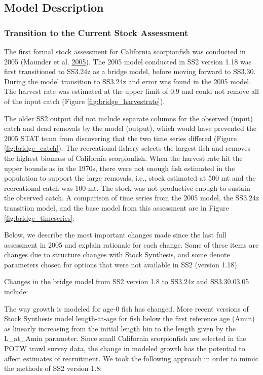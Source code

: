 \documentclass[12pt,]{article}
\begin{document}
\subsection{Model Description}\label{model-description}

\subsubsection{Transition to the Current Stock
Assessment}\label{transition-to-the-current-stock-assessment}

The first formal stock assessment for California scorpionfish was
conducted in 2005 (Maunder et al.
\protect\hyperlink{ref-Maunder2005}{2005}). The 2005 model conducted in
SS2 version 1.18 was first transitioned to SS3.24z as a bridge model,
before moving forward to SS3.30. During the model transition to SS3.24z
and error was found in the 2005 model. The harvest rate was estimated at
the upper limit of 0.9 and could not remove all of the input catch
(Figure \ref{fig:bridge_harvestrate}).

The older SS2 output did not include separate columns for the observed
(input) catch and dead removals by the model (output), which would have
prevented the 2005 STAT team from discovering that the two time series
differed (Figure \ref{fig:bridge_catch}). The recreational fishery
selects the largest fish and removes the highest biomass of California
scorpionfish. When the harvest rate hit the upper bounds as in the
1970s, there were not enough fish estimated in the population to support
the large removals, i.e., stock estimated at 500 mt and the recreational
catch was 100 mt. The stock was not productive enough to sustain the
observed catch. A comparison of time series from the 2005 model, the
SS3.24z transition model, and the base model from this assessment are in
Figure \ref{fig:bridge_timeseries}.

Below, we describe the most important changes made since the last full
assessment in 2005 and explain rationale for each change. Some of these
items are changes due to structure changes with Stock Synthesis, and
some denote parameters chosen for options that were not available in SS2
(version 1.18).

Changes in the bridge model from SS2 version 1.8 to SS3.24z and
SS3.30.03.05 include:

The way growth is modeled for age-0 fish has changed. More recent
versions of Stock Synthesis model length-at-age for fish below the first
reference age (Amin) as linearly increasing from the initial length bin
to the length given by the L\_at\_Amin parameter. Since small California
scorpionfish are selected in the POTW trawl survey data, the change in
modeled growth has the potential to affect estimates of recruitment. We
took the following approach in order to mimic the methods of SS2 version
1.8:
\end{document}
